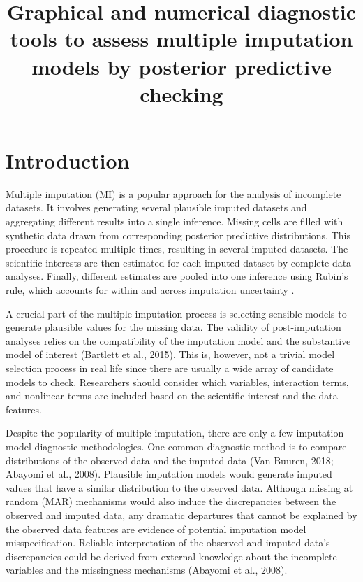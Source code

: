 \documentclass[12pt, fullpage, a4paper]{article}
\begin{document}
\title{Graphical and numerical diagnostic tools to assess multiple imputation models by posterior predictive checking}
\date{}
\maketitle
\section{Introduction}
Multiple imputation (MI) is a popular approach for the analysis of incomplete datasets. It involves generating several plausible imputed datasets and aggregating different results into a single inference. Missing cells are filled with synthetic data drawn from corresponding posterior predictive distributions. This procedure is repeated multiple times, resulting in several imputed datasets. The scientific interests are then estimated for each imputed dataset by complete-data analyses. Finally, different estimates are pooled into one inference using Rubin's rule, which accounts for within and across imputation uncertainty \cite{RubinD1987}. 

A crucial part of the multiple imputation process is selecting sensible models to generate plausible values for the missing data. The validity of post-imputation analyses relies on the compatibility of the imputation model and the substantive model of interest (Bartlett et al., 2015)\nocite{bartlett2015multiple}. This is, however, not a trivial model selection process in real life since there are usually a wide array of candidate models to check. Researchers should consider which variables, interaction terms, and nonlinear terms are included based on the scientific interest and the data features.  

Despite the popularity of multiple imputation, there are only a few imputation model diagnostic methodologies. One common diagnostic method is to compare distributions of the observed data and the imputed data (Van Buuren, 2018;\nocite{Buuren2018} Abayomi et al., 2008\nocite{abayomi2008diagnostics}). Plausible imputation models would generate imputed values that have a similar distribution to the observed data. Although missing at random (MAR) mechanisms would also induce the discrepancies between the observed and imputed data, any dramatic departures that cannot be explained by the observed data features are evidence of potential imputation model misspecification. Reliable interpretation of the observed and imputed data's discrepancies could be derived from external knowledge about the incomplete variables and the missingness mechanisms (Abayomi et al., 2008). 
\end{document}
